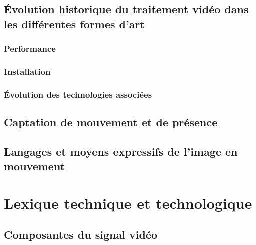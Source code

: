 \documentclass[
]{book}
\begin{document}
\hypertarget{evolution_historique}{%
\section{Évolution historique du traitement vidéo dans les différentes formes d'art}\label{evolution_historique}}

\hypertarget{evolution_historique_performance}{%
\subsection{Performance}\label{evolution_historique_performance}}

\hypertarget{evolution_historique_installation}{%
\subsection{Installation}\label{evolution_historique_installation}}

\hypertarget{evolution_historique_technologies}{%
\subsection{Évolution des technologies associées}\label{evolution_historique_technologies}}

\hypertarget{captation-de-mouvement-et-de-pruxe9sence}{%
\section{Captation de mouvement et de présence}\label{captation-de-mouvement-et-de-pruxe9sence}}

\hypertarget{evolution_historique_language}{%
\section{Langages et moyens expressifs de l'image en mouvement}\label{evolution_historique_language}}

\hypertarget{lexique}{%
\chapter{Lexique technique et technologique}\label{lexique}}

\hypertarget{lexique_composantes}{%
\section{Composantes du signal vidéo}\label{lexique_composantes}}
\end{document}
